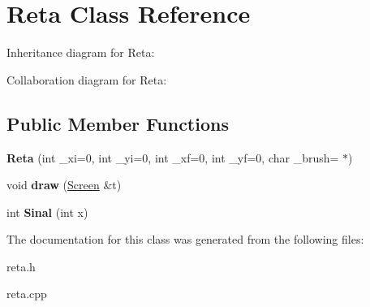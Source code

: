 \hypertarget{class_reta}{}\section{Reta Class Reference}
\label{class_reta}


Inheritance diagram for Reta\+:


Collaboration diagram for Reta\+:
\subsection*{Public Member Functions}
\begin{DoxyCompactItemize}
\item 
\mbox{\label{class_reta_ac8bf959e04418346fae799cfbf60a31b}} 
{\bfseries Reta} (int \+\_\+xi=0, int \+\_\+yi=0, int \+\_\+xf=0, int \+\_\+yf=0, char \+\_\+brush=\textquotesingle{} $\ast$\textquotesingle{})
\item 
\mbox{\label{class_reta_ac2e9805183cd474b62bffd8b032cd780}} 
void {\bfseries draw} (\hyperlink{class_screen}{Screen} \&t)
\item 
\mbox{\label{class_reta_a0890517655f27827a827c88850f8984e}} 
int {\bfseries Sinal} (int x)
\end{DoxyCompactItemize}


The documentation for this class was generated from the following files\+:\begin{DoxyCompactItemize}
\item 
reta.\+h\item 
reta.\+cpp\end{DoxyCompactItemize}
